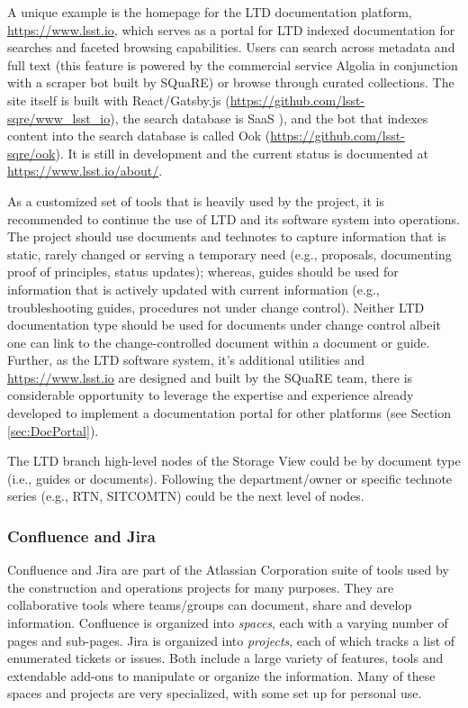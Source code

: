 A unique example is the homepage for the LTD documentation platform, \url{https://www.lsst.io}, which serves as a portal for LTD indexed documentation for searches and faceted browsing capabilities. \citep{lsst.io-cite}
Users can search across metadata and full text (this feature is powered by the commercial service Algolia \citep{Algolia-cite} in conjunction with a scraper bot built by SQuaRE) or browse through curated collections.
The site itself is built with React/Gatsby.js (\url{https://github.com/lsst-sqre/www_lsst_io}), the search database is SaaS \citep{SaaS-cite}), and the bot that indexes content into the search database is called Ook (\url{https://github.com/lsst-sqre/ook}).
It is still in development and the current status is documented at \url{https://www.lsst.io/about/}.

As a customized set of tools that is heavily used by the project, it is recommended to continue the use of LTD and its software system into operations.
The project should use documents and technotes to capture information that is static, rarely changed or serving a temporary need (e.g., proposals, documenting proof of principles, status updates);
whereas, guides should be used for information that is actively updated with current information (e.g., troubleshooting guides, procedures not under change control).
Neither LTD documentation type should be used for documents under change control albeit one can link to the change-controlled document within a document or guide.
Further, as the LTD software system, it's additional utilities and \url{https://www.lsst.io} are designed and built by the SQuaRE team, there is considerable opportunity to leverage the expertise and experience already developed to implement a documentation portal for other platforms (see Section \ref{sec:DocPortal}).

The LTD branch high-level nodes of the Storage View could be by document type (i.e., guides or documents).
Following the department/owner or specific technote series (e.g., RTN, SITCOMTN) could be the next level of nodes.

\subsubsection{Confluence and Jira}
\label{confluence-jira-storage}

Confluence \citep{Confluence-cite} and Jira \citep{Jira-cite} are part of the Atlassian Corporation suite of tools used by the construction and operations projects for many purposes.
They are collaborative tools where teams/groups can document, share and develop information.
Confluence is organized into \emph{spaces}, each with a varying number of pages and sub-pages.
Jira is organized into \emph{projects}, each of which tracks a list of enumerated tickets or issues.
Both include a large variety of features, tools and extendable add-ons to manipulate or organize the information.
Many of these spaces and projects are very specialized, with some set up for personal use.

